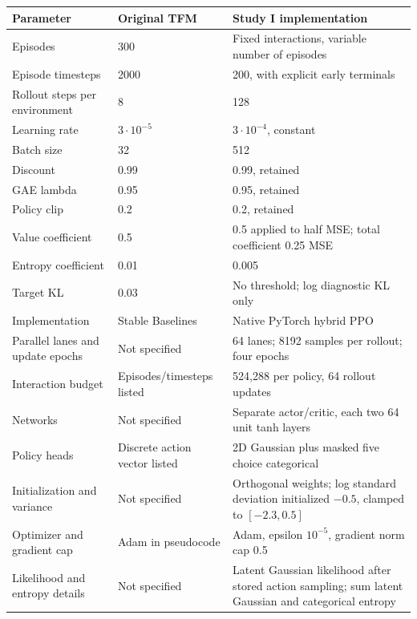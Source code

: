 \clearpage
{\centering\footnotesize
{}
\label{tab:ppocomparison}
\begin{tabular}{@{}p{}p{}p{}@{}}
\toprule
Parameter & Original TFM & Study I implementation \\
\midrule
Episodes & 300 & Fixed interactions, variable number of episodes \\
Episode timesteps & 2000 & 200, with explicit early terminals \\
Rollout steps per environment & 8 & 128 \\
Learning rate & $3\cdot10^{-5}$ & $3\cdot10^{-4}$, constant \\
Batch size & 32 & 512 \\
Discount & 0.99 & 0.99, retained \\
GAE lambda & 0.95 & 0.95, retained \\
Policy clip & 0.2 & 0.2, retained \\
Value coefficient & 0.5 & 0.5 applied to half MSE; total coefficient 0.25 MSE \\
Entropy coefficient & 0.01 & 0.005 \\
Target KL & 0.03 & No threshold; log diagnostic KL only \\
\midrule
Implementation & Stable Baselines & Native PyTorch hybrid PPO \\
Parallel lanes and update epochs & Not specified & 64 lanes; 8192 samples per rollout; four epochs \\
Interaction budget & Episodes/timesteps listed & 524,288 per policy, 64 rollout updates \\
Networks & Not specified & Separate actor/critic, each two 64 unit tanh layers \\
Policy heads & Discrete action vector listed & 2D Gaussian plus masked five choice categorical \\
Initialization and variance & Not specified & Orthogonal weights; log standard deviation initialized $-0.5$,
clamped to $[-2.3,0.5]$ \\
Optimizer and gradient cap & Adam in pseudocode & Adam, epsilon $10^{-5}$, gradient norm cap 0.5 \\
Likelihood and entropy details & Not specified & Latent Gaussian likelihood after stored action sampling;
sum latent Gaussian and categorical entropy \\

\end{tabular}}
